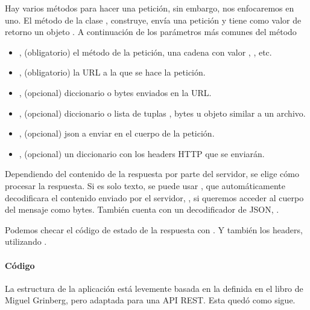 Hay varios métodos para hacer una petición, sin embargo, nos enfocaremos en uno.
El método  de la clase , construye, envía una petición
y tiene  como valor de retorno un objeto .
A continuación de los parámetros más comunes del método 
\begin{itemize}
\item {} 
, (obligatorio) el método de la petición, una cadena con valor , , etc.

\item {} 
, (obligatorio) la URL a la que se hace la petición.

\item {} 
, (opcional) diccionario o bytes enviados en la URL.

\item {} 
, (opcional)  diccionario o lista de tuplas , bytes u objeto similar a un archivo.

\item {} 
, (opcional) json a enviar en el cuerpo de la petición.

\item {} 
, (opcional) un diccionario con los headers HTTP que se enviarán.

\end{itemize}

Dependiendo del contenido de la respuesta por parte del servidor, se elige cómo
procesar la respuesta. Si es solo texto, se puede usar ,
que automáticamente decodificara el contenido enviado por el servidor,
, si queremos acceder al cuerpo del mensaje como bytes.
También cuenta con un decodificador de JSON, .

Podemos checar el código de estado de la respuesta con
. Y también los headers, utilizando .


\paragraph{Código}
\label{\detokenize{chapter_two/desc_cloudnao:codigo}}
La estructura de la aplicación está levemente basada en la definida en el libro
 de Miguel Grinberg, pero adaptada para una API REST.
Esta quedó como sigue.

